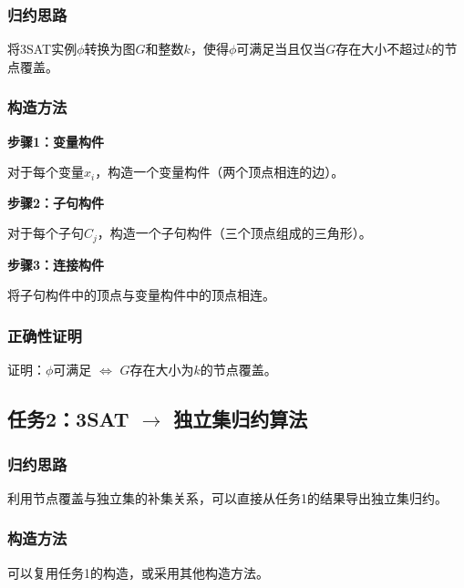 \documentclass{sysucseexp}
\begin{document}
\subsubsection{归约思路}

将3SAT实例$\phi$转换为图$G$和整数$k$，使得$\phi$可满足当且仅当$G$存在大小不超过$k$的节点覆盖。

\subsubsection{构造方法}

\textbf{步骤1：变量构件}

对于每个变量$x_i$，构造一个变量构件（两个顶点相连的边）。

\textbf{步骤2：子句构件}

对于每个子句$C_j$，构造一个子句构件（三个顶点组成的三角形）。

\textbf{步骤3：连接构件}

将子句构件中的顶点与变量构件中的顶点相连。

\subsubsection{正确性证明}

证明：$\phi$可满足 $\Leftrightarrow$ $G$存在大小为$k$的节点覆盖。

\subsection{任务2：3SAT $\to$ 独立集归约算法}

\subsubsection{归约思路}

利用节点覆盖与独立集的补集关系，可以直接从任务1的结果导出独立集归约。

\subsubsection{构造方法}

可以复用任务1的构造，或采用其他构造方法。
\end{document}
